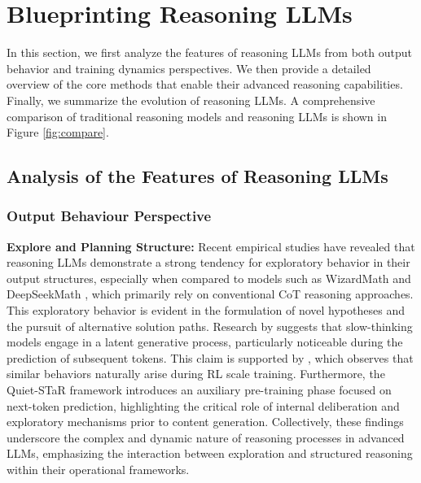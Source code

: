 


\section{Blueprinting Reasoning LLMs}\label{replication}

In this section, we first analyze the features of reasoning LLMs from both output behavior and training dynamics perspectives. We then provide a detailed overview of the core methods that enable their advanced reasoning capabilities. Finally, we summarize the evolution of reasoning LLMs. 
A comprehensive comparison of traditional reasoning models and reasoning LLMs is shown in Figure \ref{fig:compare}.





\subsection{Analysis of the Features of Reasoning LLMs}\label{o1_features}


\subsubsection{Output Behaviour Perspective}\label{output_behaviour}

\textbf{Explore and Planning Structure:} Recent empirical studies have revealed that reasoning LLMs demonstrate a strong tendency for exploratory behavior in their output structures, especially when compared to models such as WizardMath \cite{wizardmath} and DeepSeekMath \cite{deepseekmath}, which primarily rely on conventional CoT reasoning approaches. 
This exploratory behavior is evident in the formulation of novel hypotheses and the pursuit of alternative solution paths. 
Research by \cite{TowardsSystem2ReasoninLLM} suggests that slow-thinking models engage in a latent generative process, particularly noticeable during the prediction of subsequent tokens. 
This claim is supported by \cite{Deepseek-R1}, which observes that similar behaviors naturally arise during RL scale training. 
Furthermore, the Quiet-STaR framework \cite{QuietStar} introduces an auxiliary pre-training phase focused on next-token prediction, highlighting the critical role of internal deliberation and exploratory mechanisms prior to content generation. 
Collectively, these findings underscore the complex and dynamic nature of reasoning processes in advanced LLMs, emphasizing the interaction between exploration and structured reasoning within their operational frameworks.

